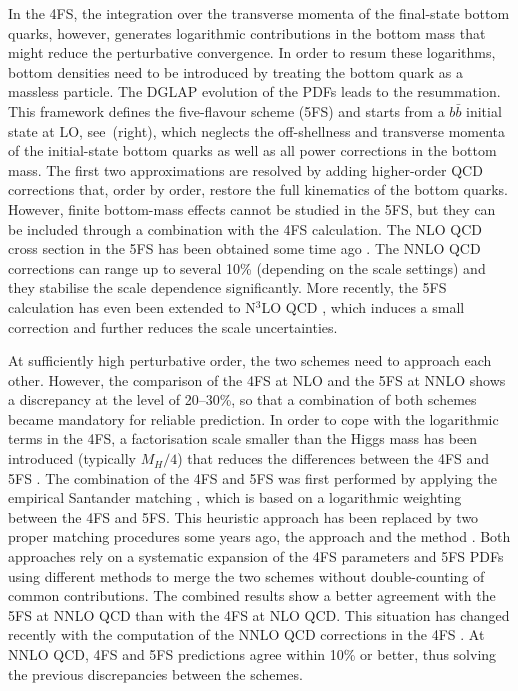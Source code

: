 \documentclass[11pt,a4paper]{article}
\begin{document}
In the 4FS, the integration over the transverse momenta of the final-state bottom quarks, however, generates logarithmic contributions in the 
bottom mass that might reduce the perturbative convergence. In order to resum these logarithms, bottom densities need to be introduced by
treating the bottom quark as a massless particle. The DGLAP evolution of the PDFs leads to the resummation. This framework defines the five-flavour scheme (5FS) and starts from a $b\bar b$ initial state at LO, see \,(right), which neglects the off-shellness and transverse momenta of the initial-state bottom quarks
as well as all power corrections in the bottom mass. The first two approximations are resolved by adding higher-order QCD corrections that, order by order, restore the full kinematics of the bottom quarks. However, finite bottom-mass effects cannot be studied in the 5FS, but they can be included
through a combination with the 4FS calculation. The NLO QCD cross section in the 5FS has been obtained some time 
ago \cite{dicus:1998hs,balazs:1998bm}. The NNLO QCD corrections \cite{harlander_2003} can range up to several 10\% (depending on the scale settings)
and they stabilise the scale dependence significantly. More recently, the 5FS calculation has even been extended to N$^3$LO QCD \cite{duhr:2019kwi}, which 
induces a small correction and further reduces the scale uncertainties.

At sufficiently high perturbative order, the two schemes need to approach each other. However, the comparison of the 4FS at NLO and the 5FS at NNLO shows a discrepancy at the level of 20--30\%, so that a combination of both schemes became mandatory for reliable prediction. In order to cope with the logarithmic terms in the 4FS, a factorisation scale smaller than the Higgs mass has been introduced (typically $M_H/4$) that reduces the differences between the 4FS and 5FS \cite{campbell2004,Maltoni:2012pa}. The combination of the 4FS and 5FS was first performed by applying the empirical Santander matching \cite{harlander:2011aa}, which is based on a logarithmic weighting between the 4FS and 5FS. This heuristic approach has been replaced by two proper matching procedures some years ago, the \fonll{} approach \cite{forte:2015hba,forte:2016sja} and the \nlonnllpart{} method \cite{Bonvini:2015pxa,Bonvini:2016fgf}. Both approaches rely on a systematic expansion of the 4FS parameters and 5FS PDFs using different methods to merge the two schemes without double-counting of common contributions. The 
combined results show a better agreement with the 5FS at NNLO QCD than with the 4FS at NLO QCD. This situation has changed recently with the computation
of the NNLO QCD corrections in the 4FS \cite{Biello:2024pgo}. At NNLO QCD, 4FS and 5FS predictions agree within 10\% or better, thus solving 
the previous discrepancies between the schemes.
\end{document}
